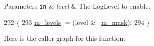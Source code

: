 \begin{DoxyParams}[1]{Parameters}
\mbox{\tt in}  & {\em level} & The Log\+Level to enable. \\
\hline
\end{DoxyParams}

\begin{DoxyCode}
292 \{
293   \hyperlink{classns3_1_1LogComponent_a5d615e327e15f2a57457844ca70313b1}{m\_levels} |= (level & ~\hyperlink{classns3_1_1LogComponent_acc996a608820204f9c01c01cc3157484}{m\_mask});
294 \}
\end{DoxyCode}


Here is the caller graph for this function\+:


